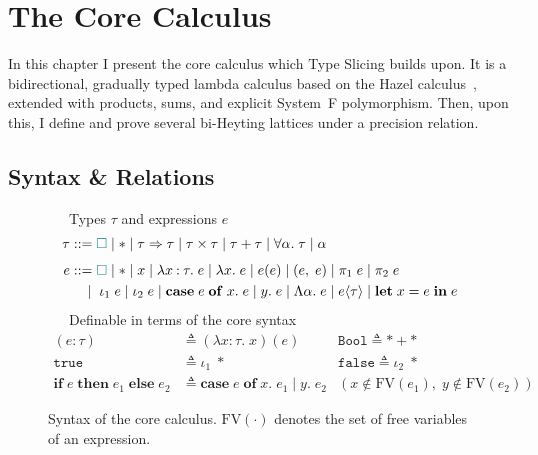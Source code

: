 \section{The Core Calculus}
\label{sec:core-calculus}

\sectionlegend

In this chapter I present the core calculus which Type Slicing builds upon. It is a bidirectional, gradually typed lambda calculus based on the Hazel calculus~\cite{HazelLivePaper}, extended with products, sums, and explicit System~F polymorphism. Then, upon this, I define and prove several bi-Heyting lattices under a precision relation. 

\subsection{\yo Syntax \& Relations}
\label{sec:core-syntax}

\begin{figure}[t]
\ \ \ Types $\tau$ and expressions $e$
\begin{align*}
\tau &::= {\color{teal}\Box} \mid * \mid \tau \Rightarrow \tau \mid \tau \times \tau \mid \tau + \tau \mid \forall\alpha.\;\tau \mid \alpha \\[4pt]
e &::= {\color{teal}\Box} \mid * \mid x \mid \lambda x \mathbin{:} \tau.\; e \mid \lambda x.\; e \mid e(e) \mid (e,\; e) \mid \pi_1\; e \mid \pi_2\; e \\
  &\quad\mid\; \iota_1\; e \mid \iota_2\; e \mid \mathbf{case}\;e\;\mathbf{of}\;x.\;e \mid y.\;e \mid \Lambda\alpha.\; e \mid e\langle\tau\rangle \mid \mathbf{let}\;x = e\;\mathbf{in}\;e
\end{align*}
\ \ \ Definable in terms of the core syntax
\vspace{-0.5em}
\begin{align*}
(e : \tau) &\triangleq (\lambda x \mathbin{:} \tau.\; x)(e) &
\texttt{Bool} \triangleq * + * \\
\texttt{true} &\triangleq \iota_1\; * &
\texttt{false} \triangleq \iota_2\; * \\
\mathbf{if}\;e\;\mathbf{then}\;e_1\;\mathbf{else}\;e_2 &\triangleq \mathbf{case}\;e\;\mathbf{of}\;x.\;e_1 \mid y.\;e_2 & (x \notin \mathrm{FV}(e_1),\; y \notin \mathrm{FV}(e_2))
\end{align*}
\caption{Syntax of the core calculus. $\mathrm{FV}(\cdot)$ denotes the set of free variables of an expression.}
\label{fig:syntax}
\end{figure}

